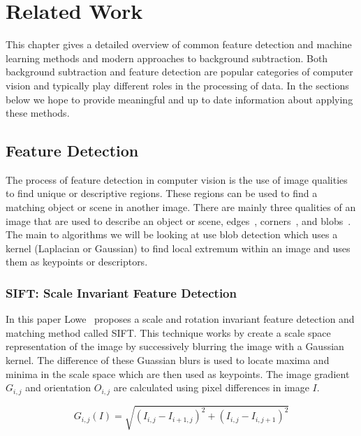 \chapter{Related Work}
\label{ch:related_work}

This chapter gives a detailed overview of common feature detection and machine learning methods and modern approaches to background subtraction. Both background subtraction and feature detection are popular categories of computer vision and typically play different roles in the processing of data. In the sections below we hope to provide meaningful and up to date information about applying these methods.


\section{Feature Detection}
\label{sec:works_feature_detection}

The process of feature detection in computer vision is the use of image qualities to find unique or descriptive regions. These regions can be used to find a matching object or scene in another image. There are mainly three qualities of an image that are used to describe an object or scene, edges~\cite{gao_2010_improved, canny_1986_computational, dalal_2005_histograms}, corners~\cite{shi_1994_good}, and blobs~\cite{lowe_1999_object, bay_2008_speeded, bay_2006_surf}. The main to algorithms we will be looking at use blob detection which uses a kernel (Laplacian or Gaussian) to find local extremum within an image and uses them as keypoints or descriptors.


\subsection{SIFT\@: Scale Invariant Feature Detection}
\label{sec:sift}
In this paper Lowe~\cite{lowe_1999_object} proposes a scale and rotation invariant feature detection and matching method called SIFT\@. This technique works by create a scale space representation of the image by successively blurring the image with a Gaussian kernel. The difference of these Guassian blurs is used to locate maxima and minima in the scale space which are then used as keypoints. The image gradient $G_{i,j}$ and orientation $O_{i,j}$ are calculated using pixel differences in image $I$.

\begin{equation}
    G_{i,j}(I) = \sqrt{{(I_{i,j}-I_{i+1,j})}^2 + {(I_{i,j}-I_{i,j+1})}^2}
    \label{eq:gradient}
\end{equation}

